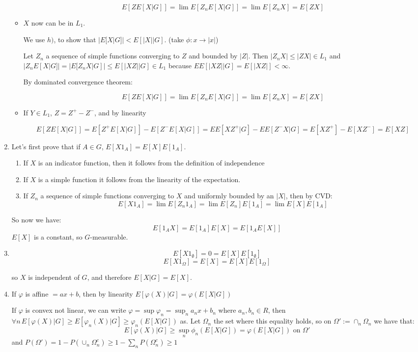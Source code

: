 \documentclass[12pt]{article}
\begin{document}
\begin{enumerate}
\begin{itemize}
$$ E[ZE[X|G]] = \lim E[Z_nE[X|G]] = \lim E[Z_nX] = E[ZX] $$


\item $X$ now can be in $L_1$. 

We use $h)$, to show that $|E[X|G]| < E[|X||G]$. (take $\phi : x \rightarrow |x|$)

Let $Z_n$ a sequence of simple functions converging to $Z$ and bounded by $|Z|$. Then 
$|Z_n X| \le |ZX| \in L_1$ and $|Z_nE[X|G]| = |E[Z_nX|G]| \le E[|XZ| | G] \in L_1$ because $EE[|XZ| | G] = E[|XZ|] < \infty$.

By dominated convergence theorem:

$$ E[ZE[X|G]] = \lim E[Z_nE[X|G]] = \lim E[Z_nX] = E[ZX] $$

\item If $Y \in L_1$, $Z = Z^+ - Z^-$, and by linearity

$$E[Z E[X|G]] = E[Z^+ E[X|G]] - E[Z^- E[X|G]] = EE[XZ^+|G] - EE[Z^-X|G] = E[XZ^+] - E[XZ^-] = E[XZ]$$


\end{itemize}

\item 


Let's first prove that if $A \in G$, $E[X1_A] = E[X] E[1_A]$.
\begin{enumerate}
\item If $X$ is an indicator function, then it follows from the definition of independence
\item If $X$ is a simple function it follows from the linearity of the expectation.
\item If $Z_n$ a sequence of simple functions converging to $X$ and uniformly bounded by an $|X|$, then by CVD:
$$E[X1_A] = \lim E[Z_n1_A] = \lim E[Z_n] E[1_A] = \lim E[X] E[1_A]$$
\end{enumerate}
So now we have:
$$E[1_A X] = E[1_A]E[X] = E[1_AE[X]]$$
$E[X]$ is a constant, so $G$-measurable.

\item 
$$E[X 1_{\emptyset}] = 0 = E[X] E[1_{\emptyset}]$$
$$E[X 1_{\Omega}] = E[X] = E[X] E[1_{\Omega}]$$

so $X$ is independent of $G$, and therefore $E[X|G] = E[X]$.

\item 

If $\varphi$ is affine $ = ax + b$, then by linearity
$E[\varphi(X) | G] = \varphi(E[X|G])$

If $\varphi$ is convex not linear, we can write $\varphi = \sup \varphi_n = \sup_n a_n x + b_n$ where $a_n, b_n \in R$, then $\forall n \, E[\varphi(X) | G] \ge E[\varphi_n(X)|G] \ge \varphi_n(E[X|G])$ as.
Let $\Omega_n$ the set where this equality holds, so on $\Omega' := \cap_n \Omega_n$ we have that:
 $$ E[\varphi(X) | G] \ge \sup_n \phi_n(E[X|G]) = \varphi(E[X|G]) \text{ on } \Omega'$$
and $P(\Omega') = 1 - P(\cup_n \Omega_n^c) \ge 1 - \sum_n P(\Omega_n^c) \ge 1$

\end{enumerate}
\end{document}
